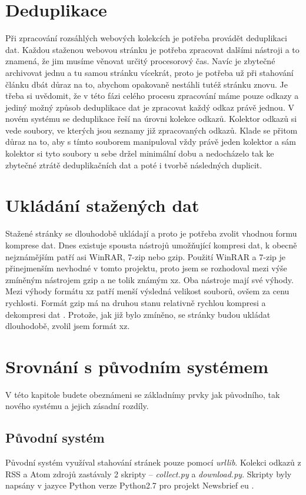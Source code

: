 \section{Deduplikace}
Při zpracování rozsáhlých webových kolekcích je potřeba provádět deduplikaci dat. Každou staženou webovou stránku je potřeba zpracovat
dalšími nástroji a to znamená, že jim musíme věnovat určitý procesorový čas. Navíc je zbytečné archivovat jednu a tu samou stránku
vícekrát, proto je potřeba už při stahování článku dbát důraz na to, abychom opakovaně nestáhli tutéž stránku znovu.
Je třeba si uvědomit, že v této fázi celého procesu zpracování máme pouze odkazy a jediný možný způsob deduplikace dat je zpracovat každý
odkaz právě jednou. V novém systému se deduplikace řeší na úrovni kolekce odkazů. Kolektor odkazů si vede soubory, ve kterých jsou seznamy již
zpracovaných odkazů. Klade se přitom důraz na to, aby s tímto souborem manipuloval vždy právě jeden kolektor a sám kolektor si tyto soubory
u sebe držel minimální dobu a nedocházelo tak ke zbytečné ztrátě deduplikačních dat a poté i tvorbě následných duplicit.

\section{Ukládání stažených dat}
Stažené stránky se dlouhodobě ukládají a proto je potřeba zvolit vhodnou formu komprese dat. Dnes existuje spousta nástrojů umožňující
kompresi dat, k obecně nejznámějším patří asi WinRAR, 7-zip nebo gzip. Použití WinRAR a 7-zip je přinejmenším nevhodné v tomto projektu,
proto jsem se rozhodoval mezi výše zmíněným nástrojem gzip a ne tolik známým xz. Oba nástroje mají své výhody.
Mezi výhody formátu xz patří menší výsledná velikost souborů, ovšem za cenu rychlosti. Formát gzip má na druhou stanu
relativně rychlou kompresi a dekompresi dat \cite{GZIP_VS_XZ}. Protože, jak již bylo zmíněno,
se stránky budou ukládat dlouhodobě, zvolil jsem formát xz.

\section{Srovnání s původním systémem}
V této kapitole budete obeznámeni se základnímy prvky jak původního, tak nového systému a jejich zásadní rozdíly.

\subsection{Původní systém}
Původní systém využíval stahování stránek pouze pomocí \textit{urllib}. Kolekci odkazů z RSS a Atom zdrojů zastávaly 2
skripty -- \textit{collect.py} a \textit{download.py}. Skripty byly napsány v jazyce Python verze Python2.7 pro projekt
Newsbrief eu \cite{NEWSBRIEF}.

